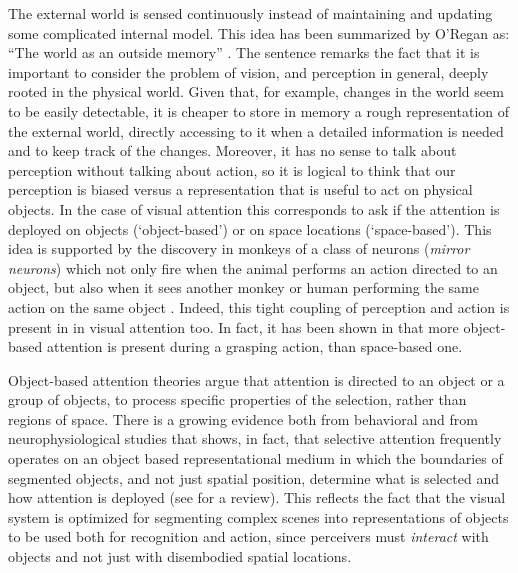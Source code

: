 \documentclass{llncs}
\begin{document}
The external world is sensed
continuously instead of maintaining and updating some
complicated internal model.
This idea has been summarized by O'Regan as:
``The world as an outside memory'' \cite{ORegan92}.
The sentence remarks the fact that it is important
to consider the problem of vision, and perception in general,
deeply rooted in the physical world. Given that, for example,
changes in the world seem to be easily detectable, it
is cheaper to store in memory a rough representation of
the external world, directly accessing to it when a
detailed information is needed and to keep track of the changes.
Moreover, it has no sense to talk about perception without
talking about action, so it is logical to
think that our perception is biased versus a representation
that is useful to act on physical objects.
In the case of visual attention this corresponds to ask
if the attention is deployed on objects (`object-based') or
on space locations (`space-based').
This idea is supported by the discovery in monkeys of a
class of neurons (\emph{mirror neurons}) which not only
fire when the animal performs an action directed to an
object, but also when it sees another monkey or human performing the
same action on the same object \cite{FadigaFGR00}.
Indeed, this tight coupling of perception and action is present in
in visual attention too. In fact, it has been shown in \cite{FischerH04}
that more object-based attention is present during a grasping action, than
space-based one.


Object-based attention theories
argue that attention is directed to an object or a group
of objects, to process specific properties of the selection,
rather than regions of space. There is a
growing evidence both from behavioral and from
neurophysiological studies that shows, in fact, that
selective attention frequently operates on an object based
representational medium in which the
boundaries of segmented objects, and not just spatial
position, determine what is selected and how attention
is deployed (see \cite{Scholl01} for a review). This reflects the fact
that the visual system is optimized for segmenting
complex scenes into representations of objects to be used both for recognition and
action, since perceivers must \emph{interact} with objects and
not just with disembodied spatial locations.
\end{document}

